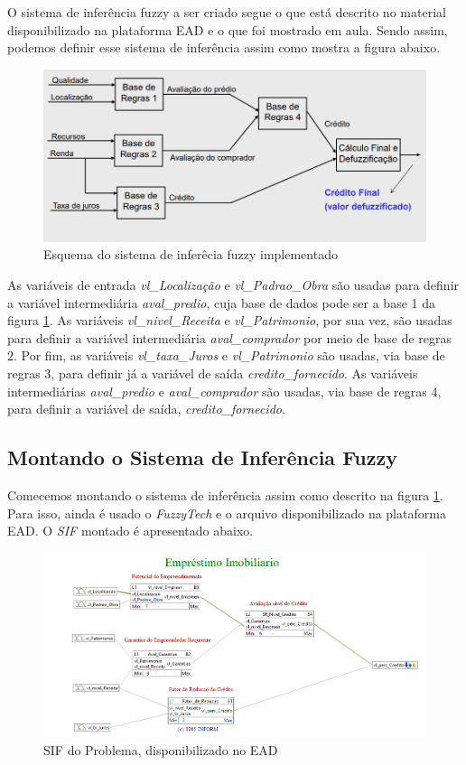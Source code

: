 \documentclass[12pt]{article}
\begin{document}
O sistema de inferência fuzzy a ser criado segue o que está descrito no material disponibilizado na plataforma EAD e o que foi mostrado em aula. Sendo assim, podemos definir esse sistema de inferência assim como mostra a figura abaixo.
\begin{figure}[H]
	\centering
	\includegraphics[width=0.9\linewidth]{Imagens/financiamento/esquemaSIF}
	\caption{Esquema do sistema de inferêcia fuzzy implementado}
	\label{fig:esquemasif}
\end{figure}

As variáveis de entrada \textit{vl\_Localização} e \textit{vl\_Padrao\_Obra} são usadas para definir a variável intermediária \textit{aval\_predio}, cuja base de dados pode ser a base 1 da figura \ref{fig:esquemasif}. As variáveis \textit{vl\_nivel\_Receita} e \textit{vl\_Patrimonio}, por sua vez, são usadas para definir a variável intermediária \textit{aval\_comprador} por meio de base de regras 2. Por fim, as variáveis \textit{vl\_taxa\_Juros} e \textit{vl\_Patrimonio} são usadas, via base de regras 3, para definir já a variável de saída \textit{credito\_fornecido}. As variáveis intermediárias \textit{aval\_predio} e \textit{aval\_comprador} são usadas, via base de regras 4, para definir a variável de saída, \textit{credito\_fornecido}.

\subsection{Montando o Sistema de Inferência Fuzzy}

Comecemos montando o sistema de inferência assim como descrito na figura \ref{fig:esquemasif}. Para isso, ainda é usado o \textit{FuzzyTech} e o arquivo disponibilizado na plataforma EAD. O \textit{SIF} montado é apresentado abaixo.
\begin{figure}[H]
	\centering
	\includegraphics[width=0.9\linewidth]{Imagens/financiamento/SIF_FuzzyTech}
	\caption{SIF do Problema, disponibilizado no EAD}
	\label{fig:siffuzzytech}
\end{figure}
\end{document}
